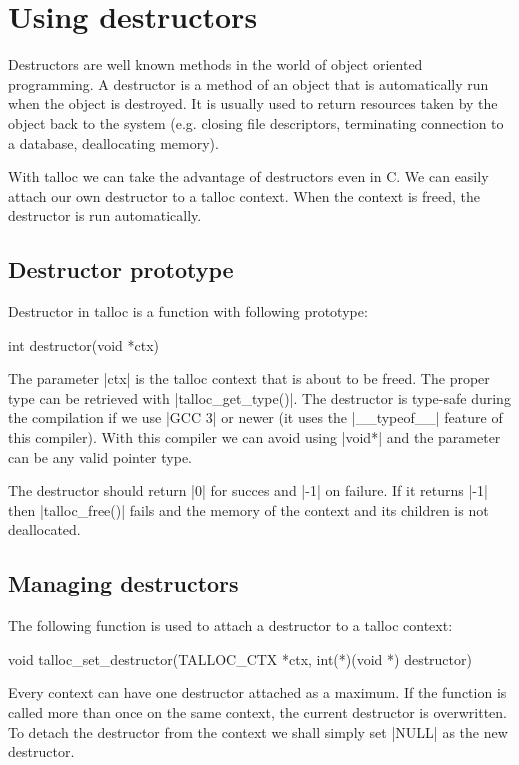\section{Using destructors}
\label{talloc:sec:destructors}

Destructors are well known methods in the world of object oriented programming.
A destructor is a method of an object that is automatically run when the object
is destroyed. It is usually used to return resources taken by the object back to
the system (e.g. closing file descriptors, terminating connection to a database,
deallocating memory).

With talloc we can take the advantage of destructors even in C. We can easily
attach our own destructor to a talloc context. When the context is freed, the
destructor is run automatically.

\subsection{Destructor prototype}

Destructor in talloc is a function with following prototype:

\begin{funcproto}
int destructor(void *ctx)
\end{funcproto}
\funclistend
The parameter |ctx| is the talloc context that is about to be freed. The proper
type can be retrieved with |talloc_get_type()|. The destructor is type-safe
during the compilation if we use |GCC 3| or newer (it uses the |__typeof__|
feature of this compiler). With this compiler we can avoid using |void*| and the
parameter can be any valid pointer type.

The destructor should return |0| for succes and |-1| on failure. If it returns
|-1| then |talloc_free()| fails and the memory of the context and its children
is not deallocated.

\subsection{Managing destructors}

The following function is used to attach a destructor to a talloc context:

\begin{funcproto}
void talloc_set_destructor(TALLOC_CTX *ctx,
                           int(*)(void *) destructor) 
\end{funcproto}
\funclistend
Every context can have one destructor attached as a maximum. If the function is
called more than once on the same context, the current destructor is
overwritten. To detach the destructor from the context we shall simply set
|NULL| as the new destructor.

